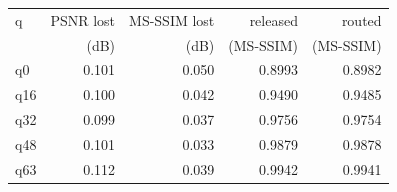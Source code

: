 \begin{tabular}{lrrrr}
\toprule
q & PSNR lost & MS-SSIM lost & released & routed \\
 & (dB) & (dB) & (MS-SSIM) & (MS-SSIM) \\
\midrule
q0 & 0.101 & 0.050 & 0.8993 & 0.8982 \\
q16 & 0.100 & 0.042 & 0.9490 & 0.9485 \\
q32 & 0.099 & 0.037 & 0.9756 & 0.9754 \\
q48 & 0.101 & 0.033 & 0.9879 & 0.9878 \\
q63 & 0.112 & 0.039 & 0.9942 & 0.9941 \\
\bottomrule
\end{tabular}
